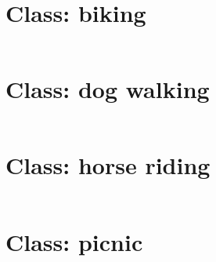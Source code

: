 \inputminted[linenos]{sql}{code/jogging.txt}
\clearpage

\section{Class: biking}

\inputminted[linenos]{sql}{code/biking.txt}
\clearpage

\section{Class: dog walking}

\inputminted[linenos]{sql}{code/dog_walking.txt}
\clearpage

\section{Class: horse riding}

\inputminted[linenos]{sql}{code/horse_riding.txt}
\clearpage

\section{Class: picnic}

\inputminted[linenos]{sql}{code/picnic.txt}
\clearpage



